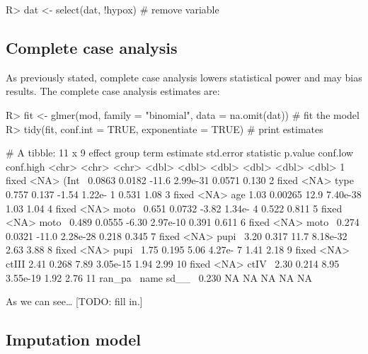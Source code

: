 \documentclass[
]{jss}
\begin{document}
\begin{CodeChunk}
\begin{CodeInput}
R> dat <- select(dat, !hypox)  # remove variable
\end{CodeInput}
\end{CodeChunk}

\hypertarget{complete-case-analysis}{%
\subsection{Complete case analysis}\label{complete-case-analysis}}

As previously stated, complete case analysis lowers statistical power
and may bias results. The complete case analysis estimates are:

\begin{CodeChunk}
\begin{CodeInput}
R> fit <- glmer(mod, family = "binomial", data = na.omit(dat)) # fit the model
R> tidy(fit, conf.int = TRUE, exponentiate = TRUE)             # print estimates
\end{CodeInput}
\begin{CodeOutput}
# A tibble: 11 x 9
   effect  group term  estimate std.error statistic   p.value conf.low conf.high
   <chr>   <chr> <chr>    <dbl>     <dbl>     <dbl>     <dbl>    <dbl>     <dbl>
 1 fixed   <NA>  (Int~   0.0863   0.0182     -11.6   2.99e-31   0.0571     0.130
 2 fixed   <NA>  type~   0.757    0.137       -1.54  1.22e- 1   0.531      1.08 
 3 fixed   <NA>  age     1.03     0.00265     12.9   7.40e-38   1.03       1.04 
 4 fixed   <NA>  moto~   0.651    0.0732      -3.82  1.34e- 4   0.522      0.811
 5 fixed   <NA>  moto~   0.489    0.0555      -6.30  2.97e-10   0.391      0.611
 6 fixed   <NA>  moto~   0.274    0.0321     -11.0   2.28e-28   0.218      0.345
 7 fixed   <NA>  pupi~   3.20     0.317       11.7   8.18e-32   2.63       3.88 
 8 fixed   <NA>  pupi~   1.75     0.195        5.06  4.27e- 7   1.41       2.18 
 9 fixed   <NA>  ctIII   2.41     0.268        7.89  3.05e-15   1.94       2.99 
10 fixed   <NA>  ctIV~   2.30     0.214        8.95  3.55e-19   1.92       2.76 
11 ran_pa~ name  sd__~   0.230   NA           NA    NA         NA         NA    
\end{CodeOutput}
\end{CodeChunk}

As we can see\ldots{} {[}TODO: fill in.{]}

\hypertarget{imputation-model}{%
\subsection{Imputation model}\label{imputation-model}}
\end{document}
